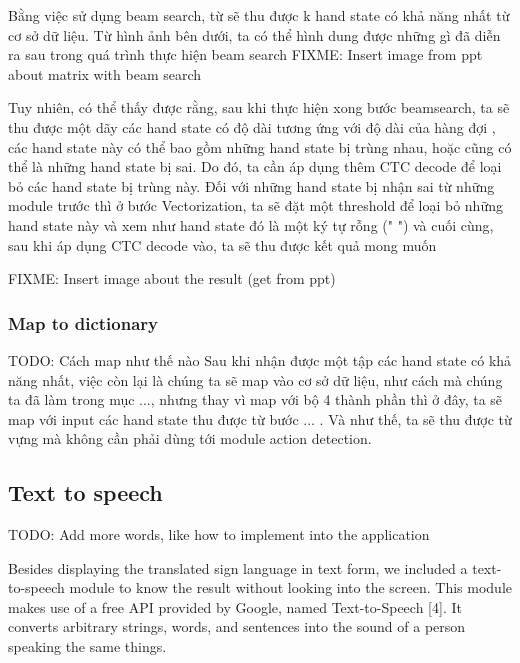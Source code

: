 Bằng việc sử dụng beam search, từ sẽ thu được k hand state có khả năng nhất
từ cơ sở dữ liệu. Từ hình ảnh bên dưới, ta có thể hình dung được những gì
đã diễn ra sau trong quá trình thực hiện beam search
FIXME: Insert image from ppt about matrix with beam search

Tuy nhiên, có thể thấy được rằng, sau khi thực hiện xong bước beamsearch,
ta sẽ thu được một dãy các hand state có độ dài tương ứng với độ dài của hàng đợi
, các hand state này có thể bao gồm những hand state bị trùng nhau, hoặc cũng có thể
là những hand state bị sai. Do đó, ta cần áp dụng thêm CTC decode để loại bỏ các hand state
bị trùng này. Đối với những hand state bị nhận sai từ những module trước thì ở bước Vectorization,
ta sẽ đặt một threshold để loại bỏ những hand state này và xem như hand state đó là một ký tự rỗng (" ")
và cuối cùng, sau khi áp dụng CTC decode vào, ta sẽ thu được kết quả mong muốn

FIXME: Insert image about the result (get from ppt)

      
      
\subsubsection{ Map to dictionary }
TODO: Cách map như thế nào
Sau khi nhận được một tập các hand state có khả năng nhất, việc còn lại là
chúng ta sẽ map vào cơ sở dữ liệu, như cách mà chúng ta đã làm trong mục ..., 
nhưng thay vì map với bộ 4 thành phần thì ở đây, ta sẽ map với input các hand state thu được
từ bước ... .
Và như thế, ta sẽ thu được từ vựng mà không cần phải dùng tới module action detection.

\subsection{Text to speech}

TODO: Add more words, like how to implement into the application

Besides displaying the translated sign language in text form, we included a text-to-speech module to know the result without looking into the screen. This module makes use of a free API provided by Google, named Text-to-Speech [4]. It converts arbitrary strings, words, and sentences into the sound of a person speaking the same things.